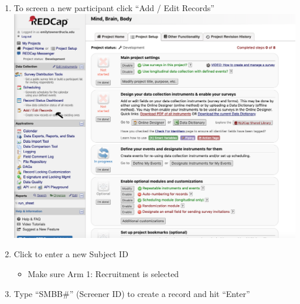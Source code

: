 \documentclass[]{book}
\providecommand{\tightlist}{%
  \setlength{\itemsep}{0pt}\setlength{\parskip}{0pt}}
\begin{document}
\begin{enumerate}
\def\labelenumi{\arabic{enumi}.}
\tightlist
\item
  To screen a new participant click ``Add / Edit Records''
  \includegraphics{images/redcap_screening/1.png}
\item
  Click to enter a new Subject ID

  \begin{itemize}
  \tightlist
  \item
    Make sure Arm 1: Recruitment is selected
  \end{itemize}
\item
  Type ``SMBB\#'' (Screener ID) to create a record and hit ``Enter''


\end{enumerate}
\end{document}
